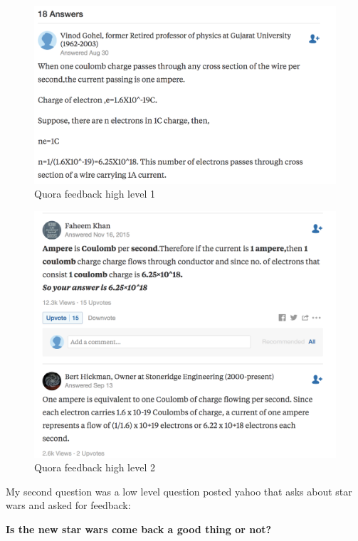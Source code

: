 \documentclass[letterpaper,11pt]{article}
\begin{document}
\begin{figure}[h]
\centering
\includegraphics[scale=0.4]{qf1.png}
\caption{Quora feedback high level 1}
\label{fig:qf1}
\end{figure}

\begin{figure}[h]
\centering
\includegraphics[scale=0.4]{qf2.png}
\caption{Quora feedback high level 2}
\label{fig:qf2}
\end{figure}

\clearpage

My second question was a low level question posted yahoo that asks about star wars and asked for feedback:

\begin{center}
\textbf{Is the new star wars come back a good thing or not?}
\end{center}
\end{document}
